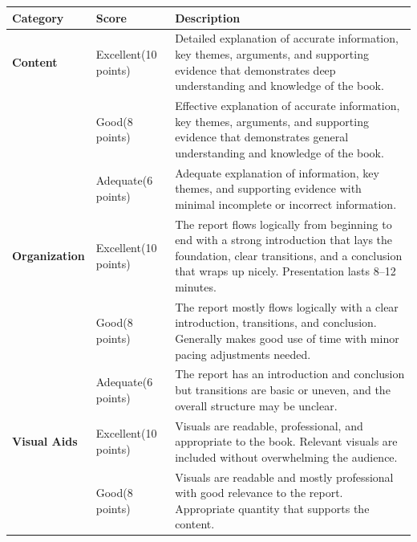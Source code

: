 \newpage

\newcommand{\fbtop}{\rule{0pt}{13.5bp}}
\newcommand{\fbbot}{\rule[-6.25bp]{0pt}{0pt}}
\newcommand{\fbcatrow}[2]{%
  \textbf{#1} & Excellent\newline(10 points) & #2 \\ \hline
}
\newcommand{\fbdescrow}[3]{%
  & #1\newline(#2 points) & #3 \\ \hline
}
\vspace*{-\topskip}\nointerlineskip
{\small\renewcommand{\arraystretch}{0}%
\noindent\begin{tabular}{|>{\raggedright\arraybackslash\fbtop}p{74.6bp}<{\fbbot}|>{\raggedright\arraybackslash\fbtop}p{49.4bp}<{\fbbot}|>{\raggedright\arraybackslash\fbtop}p{294.4bp}<{\fbbot}|}
  \hline
  Category\rule[-8.8bp]{0pt}{0pt} & Score & Description \\
  \hline
  \rowcolor{fblight}\fbcatrow{Content}{Detailed explanation of accurate information, key themes, arguments, and supporting evidence that demonstrates deep understanding and knowledge of the book.}
  \fbdescrow{Good}{8}{Effective explanation of accurate information, key themes, arguments, and supporting evidence that demonstrates general understanding and knowledge of the book.}
  \rowcolor{fblight}\fbdescrow{Adequate}{6}{Adequate explanation of information, key themes, and supporting evidence with minimal incomplete or incorrect information.}
  \fbcatrow{Organization}{The report flows logically from beginning to end with a strong introduction that lays the foundation, clear transitions, and a conclusion that wraps up nicely. Presentation lasts 8--12 minutes.}
  \rowcolor{fblight}\fbdescrow{Good}{8}{The report mostly flows logically with a clear introduction, transitions, and conclusion. Generally makes good use of time with minor pacing adjustments needed.}
  \fbdescrow{Adequate}{6}{The report has an introduction and conclusion but transitions are basic or uneven, and the overall structure may be unclear.}
  \rowcolor{fblight}\fbcatrow{Visual Aids}{Visuals are readable, professional, and appropriate to the book. Relevant visuals are included without overwhelming the audience.}
  \fbdescrow{Good}{8}{Visuals are readable and mostly professional with good relevance to the report. Appropriate quantity that supports the content.}

\end{tabular}}
